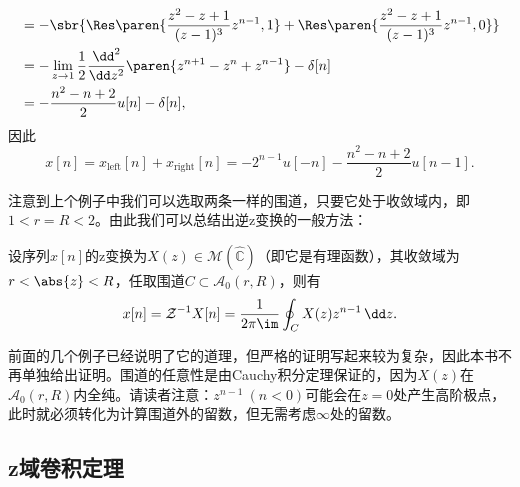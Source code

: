 \begin{example}
\begin{align}
                            & =-\sbr{\Res\paren{\frac{z^2-z+1}{(z-1)^3}z^{n-1},1}+\Res\paren{\frac{z^2-z+1}{(z-1)^3}z^{n-1},0}}\nonumber \\
                            & =-\lim_{z\to 1}\frac{1}{2}\frac{\dd^2}{\dd z^2}\paren{z^{n+1}-z^{n}+z^{n-1}}-\delta[n]\nonumber            \\
                            & =-\frac{n^2-n+2}{2}u[n]-\delta[n],
    \end{align}
    因此
    \begin{equation}
        x[n]=x_{\text{left}}[n]+x_{\text{right}}[n]=-2^{n-1}u[-n]-\frac{n^2-n+2}{2}u[n-1].
    \end{equation}
\end{example}

注意到上个例子中我们可以选取两条一样的围道，只要它处于收敛域内，即$1<r=R<2$。由此我们可以总结出逆z变换的一般方法：
\begin{theorem}\label{thm:z_inverse}
    设序列$x[n]$的z变换为$X(z)\in\mathcal{M}(\hat{\mathbb{C}})$（即它是有理函数），其收敛域为$r<\abs{z}<R$，任取围道$C\subset\mathcal{A}_0(r,R)$，则有
    \begin{equation}
        x[n]=\mathcal{Z}^{-1}X[n]=\frac{1}{2\pi\im}\oint_{C}X(z)z^{n-1}\,\dd z.
    \end{equation}
\end{theorem}

前面的几个例子已经说明了它的道理，但严格的证明写起来较为复杂，因此本书不再单独给出证明。围道的任意性是由Cauchy积分定理保证的，因为$X(z)$在$\mathcal{A}_0(r,R)$内全纯。请读者注意：$z^{n-1}\ (n<0)$可能会在$z=0$处产生高阶极点，此时就必须转化为计算围道外的留数，但无需考虑$\infty$处的留数。

\subsection{z域卷积定理}\label{sub:z_convolution}

